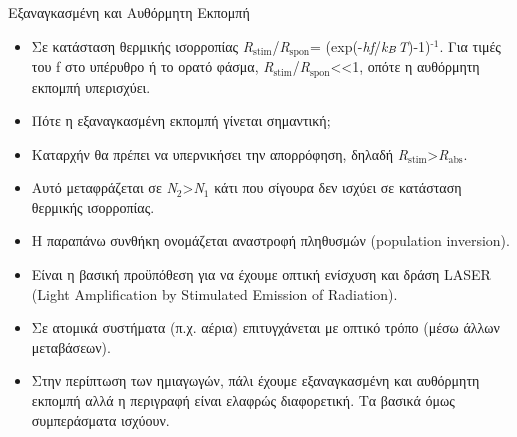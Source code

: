 \documentclass[11pt,aspectratio=169]{beamer}
\begin{document}
\begin{frame}[shrink=20,t]{Eξαναγκασμένη και Αυθόρμητη Εκπομπή}
\begin{itemize}
\item Σε κατάσταση θερμικής ισορροπίας \textit{R}$_{\text{stim}}$/\textit{R}$_{\text{spon}}$= (exp(-\textit{hf}/\textit{k}$_{\text{\textit{B}}}$\textit{T})-1)$^{\text{-1}}$. Για τιμές του f στο υπέρυθρο ή το ορατό φάσμα, \textit{R}$_{\text{stim}}$/\textit{R}$_{\text{spon}}$<<1, οπότε η αυθόρμητη εκπομπή υπερισχύει.
\item Πότε η εξαναγκασμένη εκπομπή γίνεται σημαντική;
\item Καταρχήν θα πρέπει να υπερνικήσει την απορρόφηση, δηλαδή \textit{R}$_{\text{stim}}$>\textit{R}$_{\text{abs}}$.
\item Αυτό μεταφράζεται σε \textit{Ν}$_{\text{2}}$>\textit{Ν}$_{\text{1}}$ κάτι που σίγουρα δεν ισχύει σε κατάσταση θερμικής ισορροπίας.
\item Η παραπάνω συνθήκη ονομάζεται αναστροφή πληθυσμών (population inversion).
\item Είναι η βασική προϋπόθεση για να έχουμε οπτική ενίσχυση και δράση LASER (Light Amplification by Stimulated Emission of Radiation).
\item Σε ατομικά συστήματα (π.χ. αέρια) επιτυγχάνεται με οπτικό τρόπο (μέσω άλλων μεταβάσεων).
\item Στην περίπτωση των ημιαγωγών, πάλι έχουμε εξαναγκασμένη και αυθόρμητη εκπομπή αλλά η περιγραφή είναι ελαφρώς διαφορετική. Τα βασικά όμως συμπεράσματα ισχύουν.
\end{itemize}
\end{frame}
\end{document}
